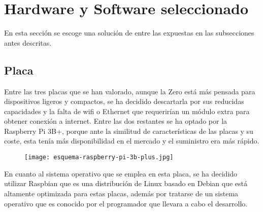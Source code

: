 \section{Hardware y Software seleccionado}\label{sec:hardwareSoftware}
En esta sección se escoge una solución de entre las expuestas en las subsecciones antes descritas.

\subsection{Placa}\label{subsec:placa}
Entre las tres placas que se han valorado, aunque la Zero está más pensada para dispositivos ligeros y compactos, se ha decidido descartarla por sus reducidas capacidades y la falta de wifi o Ethernet que requerirían un módulo extra para obtener conexión a internet. Entre las dos restantes se ha optado por la Raspberry Pi 3B+, porque ante la similitud de características de las placas y su coste, esta tenía más disponibilidad en el mercado y el suministro era más rápido.
\begin{figure}[H]
	{\texttt{[image: esquema-raspberry-pi-3b-plus.jpg]}}\label{fig:esquemaRaspberry3B}
\end{figure}
En cuanto al sistema operativo que se emplea en esta placa, se ha decidido utilizar Raspbian que es una distribución de Linux basado en Debian que está altamente optimizada para estas placas, además por tratarse de un sistema operativo que es conocido por el programador que llevara a cabo el desarrollo.

